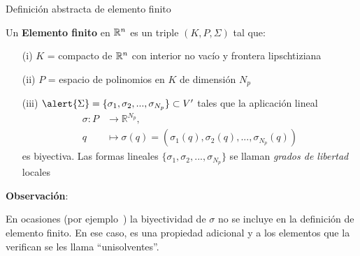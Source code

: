 \documentclass[9pt,leqno]{beamer}
\newcommand{\Np}{{N_p}}
\begin{document}
\begin{frame}{Definición abstracta de elemento finito}
  \begin{definition}
    Un \textbf{\alert{Elemento finito}} en ${\mathbb R}^n$ es un triple
    $(K,P,\Sigma)$ tal que:
    \smallskip
    \begin{itemize}
    \item[(i)] \alert{$K$} = compacto de ${\mathbb R}^n$ con interior no vac\'io y
      frontera lipschtiziana
    \item[(ii)] \alert{$P$} = espacio de polinomios en $K$ de dimensi\'on $\Np$
    \item[(iii)] $\alert{\Sigma}=\{\sigma_1,\sigma_2,...,\sigma_{\Np}\} \subset V'$
      tales que la aplicaci\'on lineal
      \begin{align*}
        \sigma: P& \longrightarrow \mathbb{R}^{\Np},\\
        q& \longmapsto \sigma(q)=(\sigma_1(q), \sigma_2(q),..., \sigma_{\Np}(q))
      \end{align*}
      es biyectiva. Las formas lineales
      $\{\sigma_1,\sigma_2,...,\sigma_{\Np}\}$ se llaman
      \textit{grados de libertad} locales
    \end{itemize}
  \end{definition}

  \par\bigskip
  \scriptsize \textbf{Observación}:
  \par\medskip
  En ocasiones (por
  ejemplo~\cite{Ciarlet:78}) la biyectividad de $\sigma$ no se incluye
  en la definición de elemento finito. En ese caso, es una propiedad
  adicional y a los elementos que la verifican se les llama
  ``unisolventes''.
\end{frame}
\end{document}
